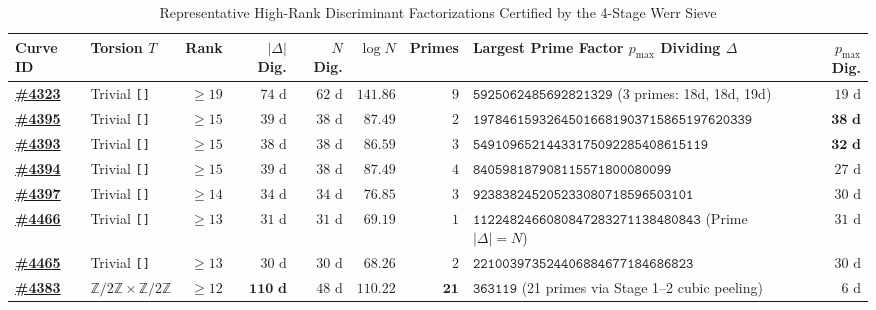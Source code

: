 \documentclass[10pt,a4paper]{article}
\theoremstyle{plain}
\theoremstyle{definition}
\theoremstyle{remark}
\begin{document}
\begin{table}[htbp]
\centering
\scriptsize
\setlength{\tabcolsep}{2.4pt}
\caption{Representative High-Rank Discriminant Factorizations Certified by the 4-Stage Werr Sieve}
\label{tab:sieve_benchmarks}
\begin{tabular}{llrrrrrlr}
\toprule
\textbf{Curve ID} & \textbf{Torsion $T$} & \textbf{Rank} & \textbf{$|\Delta|$ Dig.} & \textbf{$N$ Dig.} & \textbf{$\log N$} & \textbf{Primes} & \textbf{Largest Prime Factor $p_{\max}$ Dividing $\Delta$} & \textbf{$p_{\max}$ Dig.} \\
\midrule
\href{https://elliptic-rank.icarm.cloud/curve/4323}{\textbf{\#4323}} & Trivial \texttt{[]} & $\ge 19$ & $74\text{ d}$ & $62\text{ d}$ & $141.86$ & $9$ & $\texttt{5925062485692821329}$ (3 primes: 18d, 18d, 19d) & $19\text{ d}$ \\
\href{https://elliptic-rank.icarm.cloud/curve/4395}{\textbf{\#4395}} & Trivial \texttt{[]} & $\ge 15$ & $39\text{ d}$ & $38\text{ d}$ & $87.49$ & $2$ & $\texttt{19784615932645016681903715865197620339}$ & $\mathbf{38\text{ d}}$ \\
\href{https://elliptic-rank.icarm.cloud/curve/4393}{\textbf{\#4393}} & Trivial \texttt{[]} & $\ge 15$ & $38\text{ d}$ & $38\text{ d}$ & $86.59$ & $3$ & $\texttt{54910965214433175092285408615119}$ & $\mathbf{32\text{ d}}$ \\
\href{https://elliptic-rank.icarm.cloud/curve/4394}{\textbf{\#4394}} & Trivial \texttt{[]} & $\ge 15$ & $39\text{ d}$ & $38\text{ d}$ & $87.49$ & $4$ & $\texttt{840598187908115571800080099}$ & $27\text{ d}$ \\
\href{https://elliptic-rank.icarm.cloud/curve/4397}{\textbf{\#4397}} & Trivial \texttt{[]} & $\ge 14$ & $34\text{ d}$ & $34\text{ d}$ & $76.85$ & $3$ & $\texttt{923838245205233080718596503101}$ & $30\text{ d}$ \\
\href{https://elliptic-rank.icarm.cloud/curve/4466}{\textbf{\#4466}} & Trivial \texttt{[]} & $\ge 13$ & $31\text{ d}$ & $31\text{ d}$ & $69.19$ & $1$ & $\texttt{1122482466080847283271138480843}$ (Prime $|\Delta| = N$) & $31\text{ d}$ \\
\href{https://elliptic-rank.icarm.cloud/curve/4465}{\textbf{\#4465}} & Trivial \texttt{[]} & $\ge 13$ & $30\text{ d}$ & $30\text{ d}$ & $68.26$ & $2$ & $\texttt{221003973524406884677184686823}$ & $30\text{ d}$ \\
\href{https://elliptic-rank.icarm.cloud/curve/4383}{\textbf{\#4383}} & $\mathbb{Z}/2\mathbb{Z} \times \mathbb{Z}/2\mathbb{Z}$ & $\ge 12$ & $\mathbf{110\text{ d}}$ & $48\text{ d}$ & $110.22$ & $\mathbf{21}$ & $\texttt{363119}$ (21 primes via Stage 1--2 cubic peeling) & $6\text{ d}$ \\

\end{tabular}
\end{table}
\end{document}
